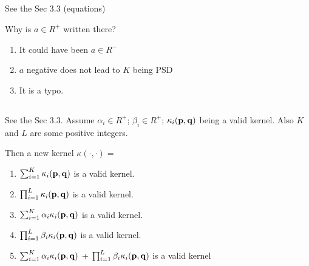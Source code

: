 \begin{frame}
\section{}
See the Sec 3.3 (equations)

Why is $a\in R^+$ written there?

\begin{enumerate}[label=(\Alph*)]
\item It could have been $a\in R^-$
\item $a$ negative does not lead to $K$ being PSD   %
\item It is a typo.
\end{enumerate}
\end{frame}

\begin{frame}
\section{}
See the Sec 3.3. Assume
$\alpha_i \in R^+$; $\beta_i \in R^+$; $\kappa_i({\bf p},{\bf q})$ being a valid kernel. Also $K$ and $L$ are some positive integers.

Then a new kernel $\kappa(\cdot,\cdot) = $
\begin{enumerate}[label=(\Alph*)]
\item $\sum_{i=1}^K \kappa_i ({\bf p},{\bf q})$ is a valid kernel.    %
\item $\prod_{i=1}^L \kappa_i ({\bf p},{\bf q})$ is a valid kernel.   %
\item $\sum_{i=1}^K \alpha_i \kappa_i ({\bf p},{\bf q})$ is a valid kernel.   %
\item $\prod_{i=1}^L \beta_i \kappa_i ({\bf p},{\bf q})$ is a valid kernel.   %
\item $\sum_{i=1}^K \alpha_i \kappa_i ({\bf p},{\bf q})$ + $\prod_{i=1}^L\beta_i \kappa_i ({\bf p},{\bf q})$ is a valid kernel    %
\end{enumerate}
\end{frame}

